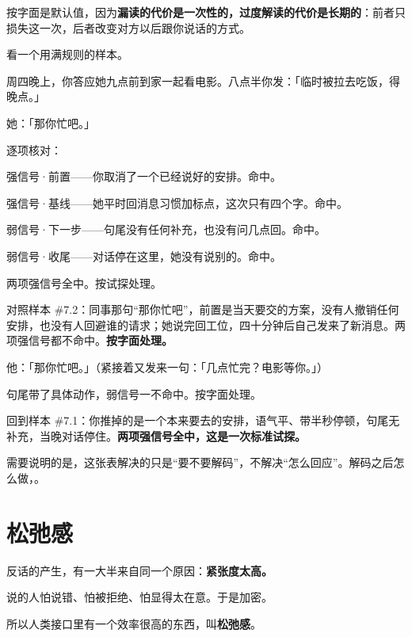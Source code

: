 按字面是默认值，因为\textbf{漏读的代价是一次性的，过度解读的代价是长期的}：前者只损失这一次，后者改变对方以后跟你说话的方式。

看一个用满规则的样本。

\par
\begin{mdquote}
周四晚上，你答应她九点前到家一起看电影。八点半你发：「临时被拉去吃饭，得晚点。」\par
她：「那你忙吧。」\par
\vspace{0.3\baselineskip}
逐项核对：\par
强信号·前置——你取消了一个已经说好的安排。命中。\par
强信号·基线——她平时回消息习惯加标点，这次只有四个字。命中。\par
弱信号·下一步——句尾没有任何补充，也没有问几点回。命中。\par
弱信号·收尾——对话停在这里，她没有说别的。命中。\par
\vspace{0.3\baselineskip}
两项强信号全中。按试探处理。
\end{mdquote}

对照样本 \#7.2：同事那句“那你忙吧”，前置是当天要交的方案，没有人撤销任何安排，也没有人回避谁的请求；她说完回工位，四十分钟后自己发来了新消息。两项强信号都不命中。\textbf{按字面处理。}

\begin{mdquote}
他：「那你忙吧。」（紧接着又发来一句：「几点忙完？电影等你。」）\par
\vspace{0.3\baselineskip}
句尾带了具体动作，弱信号一不命中。按字面处理。
\end{mdquote}

回到样本 \#7.1：你推掉的是一个本来要去的安排，语气平、带半秒停顿，句尾无补充，当晚对话停住。\textbf{两项强信号全中，这是一次标准试探。}

需要说明的是，这张表解决的只是“要不要解码”，不解决“怎么回应”。解码之后怎么做，。

\section{松弛感}

反话的产生，有一大半来自同一个原因：\textbf{紧张度太高。}

说的人怕说错、怕被拒绝、怕显得太在意。于是加密。

所以人类接口里有一个效率很高的东西，叫\textbf{松弛感}。


